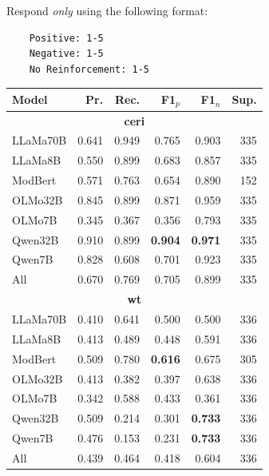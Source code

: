 \documentclass[11pt]{article}
\theoremstyle{definition}
\theoremstyle{plain}
\begin{document}
Respond \emph{only} using the following format:

\begin{verbatim}
	Positive: 1-5
	Negative: 1-5
	No Reinforcement: 1-5
\end{verbatim}

\begin{table}[t]
	\centering
	\scriptsize
	\begin{tabular}{lrrrrr}
		\toprule
		Model & Pr. & Rec. & F1$_p$ & F1$_n$ & Sup. \\
		\midrule
		
		\multicolumn{6}{c}{\textbf{\acs{ceri}}} \\
		\midrule
		LLaMa70B & 0.641 & 0.949 & 0.765 & 0.903 & 335 \\
		LLaMa8B  & 0.550 & 0.899 & 0.683 & 0.857 & 335 \\
		ModBert  & 0.571 & 0.763 & 0.654 & 0.890 & 152 \\
		OLMo32B  & 0.845 & 0.899 & 0.871 & 0.959 & 335 \\
		OLMo7B   & 0.345 & 0.367 & 0.356 & 0.793 & 335 \\
		Qwen32B  & 0.910 & 0.899 & \textbf{0.904} & \textbf{0.971} & 335 \\
		Qwen7B   & 0.828 & 0.608 & 0.701 & 0.923 & 335 \\
		All & 0.670 & 0.769 & 0.705 & 0.899 & 335 \\
		
		\midrule
		\multicolumn{6}{c}{\textbf{\acs{wt}}} \\
		\midrule
		LLaMa70B & 0.410 & 0.641 & 0.500 & 0.500 & 336 \\
		LLaMa8B  & 0.413 & 0.489 & 0.448 & 0.591 & 336 \\
		ModBert  & 0.509 & 0.780 & \textbf{0.616} & 0.675 & 305 \\
		OLMo32B  & 0.413 & 0.382 & 0.397 & 0.638 & 336 \\
		OLMo7B   & 0.342 & 0.588 & 0.433 & 0.361 & 336 \\
		Qwen32B  & 0.509 & 0.214 & 0.301 & \textbf{0.733} & 336 \\
		Qwen7B   & 0.476 & 0.153 & 0.231 & \textbf{0.733} & 336 \\
		All & 0.439 & 0.464 & 0.418 & 0.604 & {336} \\
		

\end{tabular}
\end{table}
\end{document}
